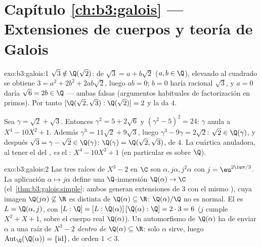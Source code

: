 \section*{Capítulo \ref{ch:b3:galois} --- Extensiones de cuerpos y
teoría de Galois}

\begin{solution}{exo:b3:galois:1}
$\sqrt3 \notin \Q(\sqrt2)$: de $\sqrt3 = a + b\sqrt2$ ($a, b
\in \Q$), elevando al cuadrado se obtiene $3 = a^2 + 2b^2 + 2ab\sqrt2$,
luego $ab =
0$; $b = 0$ haría racional $\sqrt3$, y $a = 0$ daría $\sqrt6 = 2b
\in \Q$ --- ambas falsas (argumentos habituales de factorización en
primos). Por tanto $[\Q(\sqrt2,\sqrt3) : \Q(\sqrt2)] = 2$ y la
 da
 $4$.

Sea $\gamma = \sqrt2 + \sqrt3$. Entonces $\gamma^2 = 5 + 2\sqrt6$ y
$(\gamma^2 - 5)^2 = 24$: $\gamma$ anula a $X^4 - 10X^2 + 1$. Además
$\gamma^3 = 11\sqrt2 + 9\sqrt3$, luego $\gamma^3 - 9\gamma
= 2\sqrt2$: $\sqrt2 \in \Q(\gamma)$, y después $\sqrt3 = \gamma -
\sqrt2 \in \Q(\gamma)$: $\Q(\gamma) = \Q(\sqrt2,\sqrt3)$, de
 $4$. La cuártica anuladora, al
tener el  del
, \emph{es} el
: $X^4 -
10X^2 + 1$ (en particular es
 sobre $\Q$).
\end{solution}

\begin{solution}{exo:b3:galois:2}
Las tres raíces de $X^3 - 2$ en $\C$ son $\alpha, j\alpha,
j^2\alpha$ con $j = \eu^{2\iu\pi/3}$. La aplicación $\alpha \mapsto
j\alpha$ define una $\Q$-inmersión $\Q(\alpha) \to \C$
(el~\cref{thm:b3:galois:simple}: ambos generan extensiones de  $3$
con el mismo ), cuya
imagen $\Q(j\alpha)
\not\subseteq \R$ es distinta de $\Q(\alpha) \subseteq \R$:
$\Q(\alpha)/\Q$ no es normal. El  es $L =
\Q(\alpha, j)$, con $[L:\Q] = [L:\Q(\alpha)]\,[\Q(\alpha):\Q] =
2 \cdot 3 = 6$ ($j$ cumple $X^2 + X + 1$,
 sobre el cuerpo real
$\Q(\alpha)$). Un automorfismo de $\Q(\alpha)$ ha de enviar $\alpha$ a
una raíz de $X^3 - 2$ \emph{dentro de} $\Q(\alpha) \subseteq \R$: solo
$\alpha$ sirve, luego
$\operatorname{Aut}_\Q(\Q(\alpha)) = \{\mathrm{id}\}$, de orden
$1 < 3$.
\end{solution}

